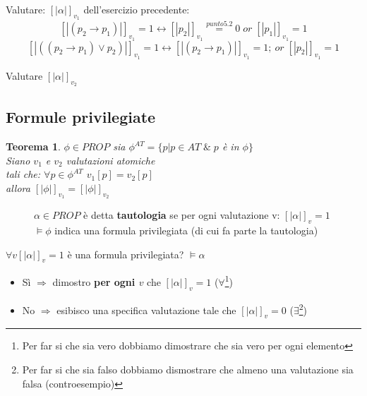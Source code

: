 \documentclass{article}
\newtheorem{theorem}{Teorema}
\theoremstyle{break}
\theoremstyle{break}
\theoremstyle{break}
\theoremstyle{break}
\begin{document}
\begin{exercise}
	Valutare: \( [|\alpha|]_{v_1} \) dell'esercizio precedente:
	\[ [|(p_2 \to p_1)|]_{v_1}=1 \leftrightarrow [|p_2|]_{v_1}\stackrel{punto 5.2}{=} 0\; or\; [|p_1|]_{v_1}=1 \]
	\[ [|((p_2 \to p_1)\vee p_2)|]_{v_1} = 1 \leftrightarrow [|(p_2 \to p_1)|]_{v_1}=1;\ or\; [|p_2|]_{v_1}=1 \]
\end{exercise}

\begin{exercise}[A casa]
	Valutare \( [|\alpha|]_{v_2} \)
\end{exercise}


\subsection{Formule privilegiate}
\begin{theorem}
	\( \phi \in PROP \) sia \( \phi^{AT} = \{ p | p \in AT\; \&\; p \) è in \( \phi\} \) \\
	Siano \( v_1 \) e \( v_2 \) valutazioni atomiche\\
	tali che: \( \forall p \in \phi^{AT} \) \( v_1[p]=v_2[p] \) \\
	allora \( [|\phi|]_{v_1} = [|\phi|]_{v_2} \)
\end{theorem}

\begin{figure}[H]
    \begin{definition}
        \( \alpha \in PROP \) è detta \textbf{tautologia} se per ogni valutazione
        v: \( [|\alpha|]_v = 1 \)\\
        \(
        \models \phi
        \) indica una formula privilegiata (di cui fa parte la tautologia)
    \end{definition}
\end{figure}

\( \forall v [|\alpha|]_v = 1 \) è una formula privilegiata? \( \models \alpha \)
\begin{itemize}
	\item Sì \( \Rightarrow \) dimostro \textbf{per ogni \( v \)} che \( [|\alpha|]_v = 1\) (\( \forall  \)\footnote{Per far si che sia vero
		      dobbiamo dimostrare che sia vero per ogni elemento})
	\item No \( \Rightarrow \) esibisco una specifica valutazione
	      tale che \( [|\alpha|]_v= 0 \) (\( \exists  \)\footnote{Per far si che sia falso
		      dobbiamo dismostrare che almeno una valutazione sia falsa (controesempio)})
\end{itemize}
\end{document}
